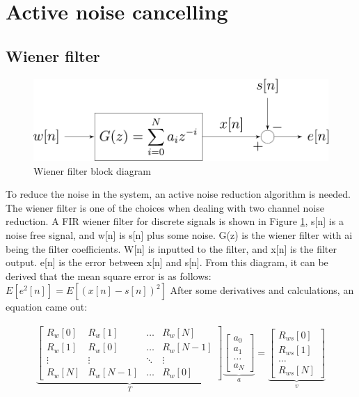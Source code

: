 \section{Active noise cancelling}

\subsection{Wiener filter}

\begin{figure}[htbp]
\centerline{\includegraphics[scale=0.5]{3-literature/Wiener_block.pdf}}
\caption{Wiener filter block diagram}
\label{fig_Wiener_block}
\end{figure}

To reduce the noise in the system, an active noise reduction algorithm is needed.  The wiener filter is one of the choices when dealing with two channel noise reduction.  A FIR wiener filter for discrete signals \cite{WienerPaper} is shown in Figure \ref{fig_Wiener_block}, s[n] is a noise free signal, and w[n] is s[n] plus some noise.  G(z) is the wiener filter with ai being the filter coefficients.   W[n] is inputted to the filter, and x[n] is the filter output.  e[n] is the error between x[n] and s[n].  From this diagram, it can be derived that the mean square error is as follows:
$E[e^2 [n]]=E[(x[n]-s[n])^2 ]$
After some derivatives and calculations, an equation came out:


\begin{gather} \label{eqn_WienerMatrix}
\underbrace{
    \begin{bmatrix}
    R_w[0] & R_w[1] & \dots & R_w[N] \\
    R_w[1] & R_w[0] & \dots & R_w[N-1] \\
    \vdots & \vdots & \ddots & \vdots \\
    R_w[N] & R_w[N-1] & \dots & R_w[0]
    \end{bmatrix}
}_{T}
\underbrace{
    \begin{bmatrix}
    a_0 \\
    a_1 \\
    \dots \\
    a_N
    \end{bmatrix}
}_{a}
=
\underbrace{
    \begin{bmatrix}
    R_{ws}[0] \\
    R_{ws}[1] \\
    \dots \\
    R_{ws}[N]
    \end{bmatrix}
}_{v}
\end{gather}

